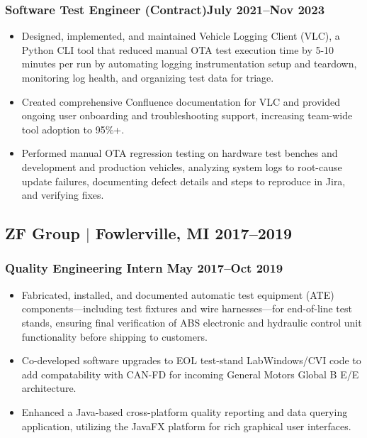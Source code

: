 \documentclass[10pt]{article}
\begin{document}
\subsubsection{Software Test Engineer (Contract)\hfill July 2021--Nov 2023}
\begin{itemize}
	\item Designed, implemented, and maintained Vehicle Logging Client (VLC),
	a Python CLI tool that reduced manual OTA test execution time by 5-10 minutes per run
	by automating logging instrumentation setup and teardown, monitoring log health, and 
	organizing test data for triage. 
	\item Created comprehensive Confluence documentation for VLC and provided ongoing
	user onboarding and troubleshooting support, increasing team-wide tool adoption to 95\%+.
	\item Performed manual OTA regression testing on hardware test benches and development and 
	production vehicles, analyzing system logs to root-cause update failures, 
	documenting defect details and steps to reproduce in Jira, and verifying fixes.
\end{itemize}

\subsection{ZF Group $|$ {\normalfont Fowlerville, MI} \hfill 2017--2019}
\vspace*{0.05in}
\subsubsection{Quality Engineering Intern \hfill May 2017--Oct 2019}
\begin{itemize}
	\item Fabricated, installed, and documented automatic test equipment (ATE) components—including 
	test fixtures and wire harnesses—for end-of-line test stands, ensuring final verification of ABS 
	electronic and hydraulic control unit functionality before shipping to customers.
	\item Co-developed software upgrades to EOL test-stand LabWindows/CVI code to add compatability with CAN-FD for 
	incoming General Motors Global B E/E architecture.
	\item Enhanced a Java-based cross-platform quality reporting and data querying application, utilizing the JavaFX 
	platform for rich graphical user interfaces.
\end{itemize}
\end{document}
